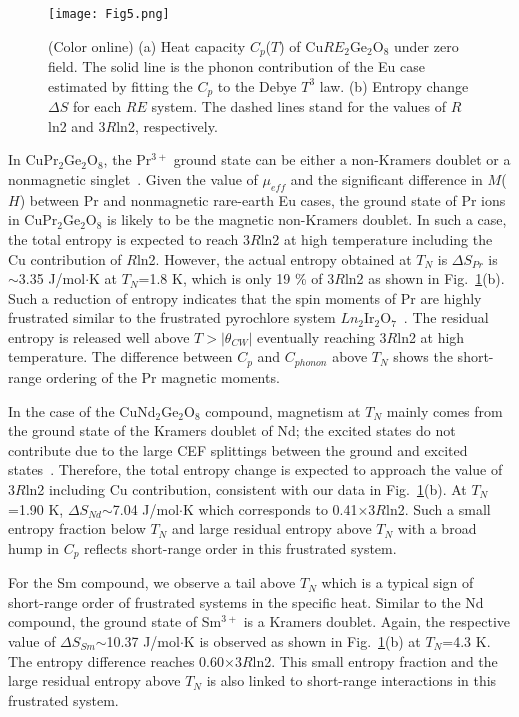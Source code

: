 \documentclass[aps,prl,reprint,amsmath,amssymb,superscriptaddress,showpacs]{revtex4-1}
\begin{document}
\begin{figure}[t]
\texttt{[image: Fig5.png]}
\caption{\label{fig5}(Color online) (a) Heat capacity $C_p$($T$) of Cu$RE_2$Ge$_2$O$_8$ under zero field. The solid line is the phonon contribution of the Eu case estimated by fitting the $C_p$ to the Debye $T^3$ law. (b) Entropy change $\Delta$$S$ for each $RE$ system. The dashed lines stand for the values of $R$ln2 and 3$R$ln2, respectively.}     
\end{figure}

In CuPr$_2$Ge$_2$O$_8$, the Pr$^{3+}$ ground state can be either a non-Kramers doublet or a nonmagnetic singlet~\cite{S.Nakatsuji2006,A.Princep2013}. Given the value of $\mu_{eff}$ and the significant difference in $M$($H$) between Pr and nonmagnetic rare-earth Eu cases, the ground state of Pr ions in CuPr$_2$Ge$_2$O$_8$ is likely to be the magnetic non-Kramers doublet. In such a case, the total entropy is expected to reach 3$R$ln2 at high temperature including the Cu contribution of $R$ln2. However, the actual entropy obtained at $T_N$ is $\Delta$$S_{Pr}$ is $\sim$3.35 J/mol$\cdot$K at $T_N$=1.8 K, which is only 19 \% of 3$R$ln2 as shown in Fig.~\ref{fig5}(b). Such a reduction of entropy indicates that the spin moments of Pr are highly frustrated similar to the frustrated pyrochlore system $Ln_2$Ir$_2$O$_7$~\cite{K.Matsuhira2011}. The residual entropy is released well above $T>\lvert\theta_{CW}\lvert$ eventually reaching 3$R$ln2 at high temperature. The difference between $C_p$ and $C_{phonon}$ above $T_N$ shows the short-range ordering of the Pr magnetic moments.

In the case of the CuNd$_2$Ge$_2$O$_8$ compound, magnetism at $T_N$ mainly comes from the ground state of the Kramers doublet of Nd; the excited states do not contribute due to the large CEF splittings between the ground and excited states~\cite{M.Watahiki2011}. Therefore, the total entropy change is expected to approach the value of 3$R$ln2 including Cu contribution, consistent with our data in Fig.~\ref{fig5}(b). At $T_N$=1.90 K, $\Delta$$S_{Nd}$$\sim$7.04 J/mol$\cdot$K which corresponds to 0.41$\times$3$R$ln2. Such a small entropy fraction below $T_N$ and large residual entropy above $T_N$ with a broad hump in $C_p$ reflects short-range order in this frustrated system. 

For the Sm compound, we observe a tail above $T_N$ which is a typical sign of short-range order of frustrated systems in the specific heat. Similar to the Nd compound, the ground state of Sm$^{3+}$ is a Kramers doublet. Again, the respective value of $\Delta$$S_{Sm}$$\sim$10.37 J/mol$\cdot$K is observed as shown in Fig.~\ref{fig5}(b) at $T_N$=4.3 K. The entropy difference reaches 0.60$\times$3$R$ln2. This small entropy fraction and the large residual entropy above $T_N$ is also linked to short-range interactions in this frustrated system. 
\end{document}
